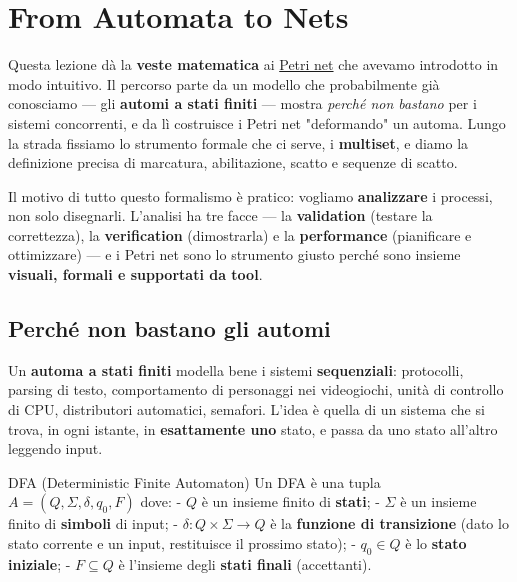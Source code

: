 \chapter{\texorpdfstring{From Automata to Nets}{From Automata to Nets}}
\label{ch:08}

Questa lezione dà la \textbf{veste matematica} ai \hyperref[ch:04]{Petri net} che avevamo introdotto in modo intuitivo. Il percorso parte da un modello che probabilmente già conosciamo — gli \textbf{automi a stati finiti} — mostra \emph{perché non bastano} per i sistemi concorrenti, e da lì costruisce i Petri net "deformando" un automa. Lungo la strada fissiamo lo strumento formale che ci serve, i \textbf{multiset}, e diamo la definizione precisa di marcatura, abilitazione, scatto e sequenze di scatto.

Il motivo di tutto questo formalismo è pratico: vogliamo \textbf{analizzare} i processi, non solo disegnarli. L'analisi ha tre facce — la \textbf{validation} (testare la correttezza), la \textbf{verification} (dimostrarla) e la \textbf{performance} (pianificare e ottimizzare) — e i Petri net sono lo strumento giusto perché sono insieme \textbf{visuali, formali e supportati da tool}.

\section{\texorpdfstring{Perché non bastano gli automi}{Perché non bastano gli automi}}

Un \textbf{automa a stati finiti} modella bene i sistemi \textbf{sequenziali}: protocolli, parsing di testo, comportamento di personaggi nei videogiochi, unità di controllo di CPU, distributori automatici, semafori. L'idea è quella di un sistema che si trova, in ogni istante, in \textbf{esattamente uno} stato, e passa da uno stato all'altro leggendo input.

\begin{boxdefinition}{DFA (Deterministic Finite Automaton)}
Un DFA è una tupla $A = (Q, \Sigma, \delta, q_0, F)$ dove: - $Q$ è un insieme finito di \textbf{stati}; - $\Sigma$ è un insieme finito di \textbf{simboli} di input; - $\delta : Q \times \Sigma \to Q$ è la \textbf{funzione di transizione} (dato lo stato corrente e un input, restituisce il prossimo stato); - $q_0 \in Q$ è lo \textbf{stato iniziale}; - $F \subseteq Q$ è l'insieme degli \textbf{stati finali} (accettanti).
\end{boxdefinition}

